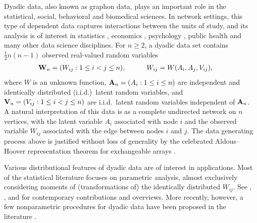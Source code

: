 Dyadic data, also known as graphon data, plays an important role in the
statistical, social, behavioral and biomedical sciences. In network settings,
this type of dependent data captures interactions between the units of study,
and its analysis is of interest in statistics \citep{kolaczyk2009statistical},
economics \citep{graham2020network}, psychology \citep{kenny2020dyadic}, public
health \citep{luke2007network} and many other data science disciplines. For
$n \geq 2$, a dyadic data set contains $\frac{1}{2}n(n-1)$ observed real-valued
random variables
%
\begin{align*}
  \mathbf{W}_n = (W_{i j}:1\leq i<j \leq n),
  \quad\qquad W_{i j}
  &= W(A_i,A_j,V_{i j}),
\end{align*}
%
where $W$ is an unknown function, $\mathbf{A}_n=(A_{i}:1\leq i \leq n)$ are
independent and identically distributed (i.i.d.)\ latent random variables, and
$\mathbf{V}_n=(V_{i j}:1\leq i<j \leq n)$ are i.i.d.\ latent random variables
independent of $\mathbf{A}_n$. A natural interpretation of this data is as a complete
undirected network on $n$ vertices, with the latent variable $A_i$ associated
with node $i$ and the observed variable $W_{i j}$ associated with the edge
between nodes $i$ and $j$. The data generating process above is justified
without loss of generality by the celebrated Aldous--Hoover representation
theorem for exchangeable arrays
\citep{aldous1981representations,hoover1979relations}.

Various distributional features of dyadic data are of interest in applications.
Most of the statistical literature focuses on parametric analysis, almost
exclusively considering moments of (transformations of) the identically
distributed $W_{i j}$. See \citet{davezies2021exchangeable},
\citet{gao2021minimax}, and \citet{matsushita2021jackknife} for
contemporary contributions and overviews. More recently, however, a few
nonparametric procedures for dyadic data have been proposed in the literature
\citep{graham2021minimax,graham2024kernel}.

